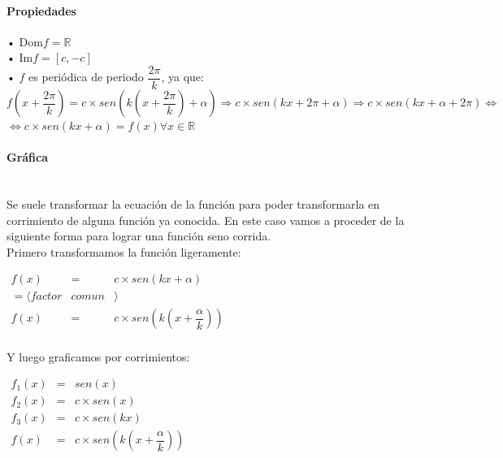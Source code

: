 \paragraph{Propiedades}

• Dom$f = \mathbb{R}$\\

• Im$f = [c, -c]$\\

• $f$ es periódica de periodo $\dfrac{2\pi}{k}$, ya que:\\

\qquad $f\left(x+\dfrac{2 \pi}{k}\right)= c \times sen\left(k \left(x+\dfrac{2 \pi}{k}\right)+\alpha \right) \Rightarrow c \times sen(kx+2\pi+\alpha) \Rightarrow c \times sen(kx+\alpha +2\pi) \Leftrightarrow$\\

\qquad $\Leftrightarrow c\times sen(kx+\alpha)=f(x)$\quad $\forall x \in \mathbb{R}$

\paragraph{Gráfica}
\qquad \\

Se suele transformar la ecuación de la función para poder transformarla en corrimiento de alguna función ya conocida. En este caso vamos a proceder de la siguiente forma para lograr una función seno corrida.\\

Primero transformamos la función ligeramente:
\begin{center}
$
\begin{array}{ccc}

f(x) & = & c \times sen(kx+\alpha)\\
= \langle factor &  comun &\rangle \qquad \qquad\\
f(x) & = & c \times sen\left(k\left(x+\dfrac{\alpha}{k}\right) \right)\\
\end{array}$\\
\end{center}
Y luego graficamos por corrimientos:
\begin{center}
$
\begin{array}{ccc}

f_1(x) & = & sen(x)\\
f_2(x) & = &c \times sen(x)\\
f_3(x) & = &c \times sen(kx)\\
f(x) & = &c \times sen\left(k\left(x+\dfrac{\alpha}{k}\right) \right)
\end{array}$\\

\end{center}

